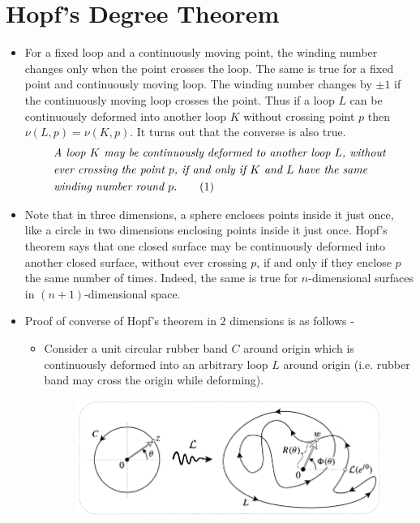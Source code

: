 \documentclass[12pt]{article}
\newcommand\numberthis{\addtocounter{equation}{1}\tag{\theequation}}
\def\tt{\textit}
\begin{document}
\section{Hopf's Degree Theorem}
\begin{itemize}
    \item For a fixed loop and a continuously moving point, the winding number changes only when the point crosses the loop. The same is true for a fixed point and continuously moving loop. The winding number changes by $\pm 1$ if the continuously moving loop crosses the point. Thus if a loop $L$ can be continuously deformed into another loop $K$ without crossing point $p$ then $\nu(L,p) = \nu(K,p)$. It turns out that the converse is also true. 
    \begin{align*}
        &\tt{A loop $K$ may be continuously deformed to another loop $L$, without}\\
        &\tt{ever crossing the point $p$, if and only if $K$ and $L$ have the same}\\
        &\tt{winding number round $p$.} \numberthis \label{e2}
    \end{align*}
    \item Note that in three dimensions, a sphere encloses points inside it just once, like a circle in two dimensions enclosing points inside it just once. Hopf's theorem says that one closed surface may be continuously deformed into another closed surface, without ever crossing $p$, if and only if they enclose $p$ the same number of times. Indeed, the same is true for $n$-dimensional surfaces in $(n+1)$-dimensional space.
    \item Proof of converse of Hopf's theorem in $2$ dimensions is as follows - 
    \begin{itemize}
        \item Consider a unit circular rubber band $C$ around origin which is continuously deformed into an arbitrary loop $L$ around origin (i.e. rubber band may cross the origin while deforming).
        \begin{figure}[h!]
            \centering
            \includegraphics[scale=0.7]{fig_2}

\end{figure}
\end{itemize}
\end{itemize}
\end{document}
